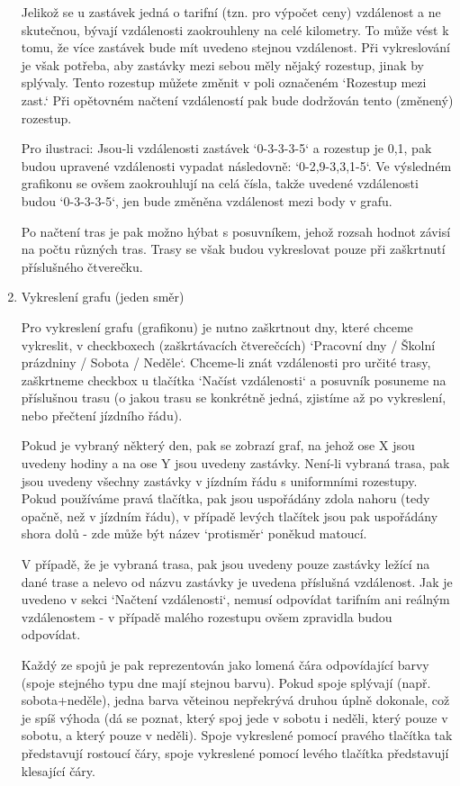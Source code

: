 \documentclass[14pt]{article}
\begin{document}
\begin{enumerate}
Jelikož se u zastávek jedná o tarifní (tzn. pro výpočet ceny) vzdálenost a ne skutečnou, bývají vzdálenosti zaokrouhleny na celé kilometry. To může vést k tomu, že více zastávek bude mít uvedeno stejnou vzdálenost. 
Při vykreslování je však potřeba, aby zastávky mezi sebou měly nějaký rozestup, jinak by splývaly. Tento rozestup můžete změnit v poli označeném `Rozestup mezi zast.` Při opětovném načtení vzdáleností pak bude dodržován tento (změnený) rozestup.

Pro ilustraci: Jsou-li vzdálenosti zastávek `0-3-3-3-5` a rozestup je 0,1, pak budou upravené vzdálenosti vypadat následovně: `0-2,9-3,3,1-5`. Ve výsledném grafikonu se ovšem zaokrouhlují na celá čísla, takže uvedené vzdálenosti budou `0-3-3-3-5`, jen bude změněna vzdálenost mezi body v grafu.

Po načtení tras je pak možno hýbat s posuvníkem, jehož rozsah hodnot závisí na počtu různých tras. Trasy se však budou vykreslovat pouze při zaškrtnutí příslušného čtverečku.

\item Vykreslení grafu (jeden směr)

Pro vykreslení grafu (grafikonu) je nutno zaškrtnout dny, které chceme vykreslit, v checkboxech (zaškrtávacích čtverečcích) `Pracovní dny / Školní prázdniny / Sobota / Neděle`. Chceme-li znát vzdálenosti pro určité trasy, zaškrtneme checkbox u tlačítka `Načíst vzdálenosti` a posuvník posuneme na příslušnou trasu 
(o jakou trasu se konkrétně jedná, zjistíme až po vykreslení, nebo přečtení jízdního řádu).

Pokud je vybraný některý den, pak se zobrazí graf, na jehož ose X jsou uvedeny hodiny a na ose Y jsou uvedeny zastávky. Není-li vybraná trasa, pak jsou uvedeny všechny zastávky v jízdním řádu s uniformními rozestupy. Pokud používáme pravá tlačítka, pak jsou uspořádány zdola nahoru (tedy opačně, než v jízdním řádu), v případě levých tlačítek jsou pak uspořádány shora dolů - zde může být název `protisměr` poněkud matoucí.

V případě, že je vybraná trasa, pak jsou uvedeny pouze zastávky ležící na dané trase a nelevo od názvu zastávky je uvedena příslušná vzdálenost. Jak je uvedeno v sekci `Načtení vzdálenosti`, nemusí odpovídat tarifním ani reálným vzdálenostem - v případě malého rozestupu ovšem zpravidla budou odpovídat.

Každý ze spojů je pak reprezentován jako lomená čára odpovídající barvy (spoje stejného typu dne mají stejnou barvu). Pokud spoje splývají (např. sobota+neděle), jedna barva věteinou nepřekrývá druhou úplně dokonale, což je spíš výhoda (dá se poznat, který spoj jede v sobotu i neděli, který pouze v sobotu, a který pouze v neděli). Spoje vykreslené pomocí pravého tlačítka tak představují rostoucí čáry, spoje vykreslené pomocí levého tlačítka představují klesající čáry.


\end{enumerate}
\end{document}
